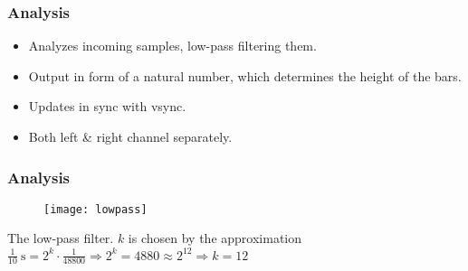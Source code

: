 \begin{frame}
  \frametitle{Analysis}
  \begin{itemize}
  \item Analyzes incoming samples, low-pass filtering them.
  \item Output in form of a natural number, which determines the height of the bars.
  \item Updates in sync with vsync.
  \item Both left \& right channel separately.
  \end{itemize}
\end{frame}

\begin{frame}
  \frametitle{Analysis}
  \begin{figure}[h]
    \centering
    \texttt{[image: lowpass]}
  \end{figure}
    The low-pass filter. $k$ is chosen by the approximation $\frac{1}{10}\mathrm{\ s} = 2^k\cdot\frac{1}{48800}\Rightarrow 2^k=4880\approx 2^{12}\Rightarrow k = 12 $
\end{frame}
